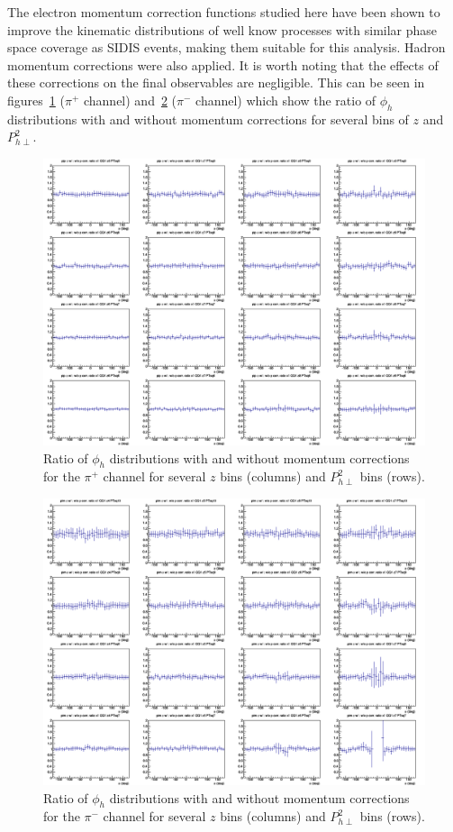 The electron momentum correction functions studied here have been shown to improve the kinematic distributions of well know processes with similar phase space coverage as SIDIS events, making them suitable for this analysis.
Hadron momentum corrections were also applied.
It is worth noting that the effects of these corrections on the final observables are negligible. This can be seen in figures~\ref{fig:compareMoCo_pip} ($\pi^+$ channel) and~\ref{fig:compareMoCo_pim} ($\pi^-$ channel) which show the ratio of $\phi_h$ distributions with and without momentum corrections for several bins of $z$ and $P_{h\perp}^2$.
%
\begin{figure}[htp]
\centering
\includegraphics[width=6in]{figures/compareMoCo_pip.png}
\caption{Ratio of $\phi_h$ distributions with and without momentum corrections for the $\pi^+$ channel for several $z$ bins (columns) and $P_{h\perp}^2$ bins (rows).}
\label{fig:compareMoCo_pip}
\end{figure}
%
\begin{figure}[htp]
\centering
\includegraphics[width=6in]{figures/compareMoCo_pim.png}
\caption{Ratio of $\phi_h$ distributions with and without momentum corrections for the $\pi^-$ channel for several $z$ bins (columns) and $P_{h\perp}^2$ bins (rows).}
\label{fig:compareMoCo_pim}
\end{figure}
%

\clearpage %
